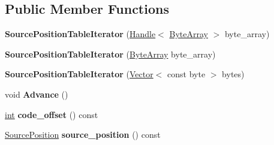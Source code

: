 \subsection*{Public Member Functions}
\begin{DoxyCompactItemize}
\item 
\mbox{\label{classv8_1_1internal_1_1SourcePositionTableIterator_ae5f159345c88e6b6b7778d65aca7fe71}} 
{\bfseries Source\+Position\+Table\+Iterator} (\mbox{\hyperlink{classv8_1_1internal_1_1Handle}{Handle}}$<$ \mbox{\hyperlink{classv8_1_1internal_1_1ByteArray}{Byte\+Array}} $>$ byte\+\_\+array)
\item 
\mbox{\label{classv8_1_1internal_1_1SourcePositionTableIterator_acfce9c7817e2cc9dbb327f998f7049a8}} 
{\bfseries Source\+Position\+Table\+Iterator} (\mbox{\hyperlink{classv8_1_1internal_1_1ByteArray}{Byte\+Array}} byte\+\_\+array)
\item 
\mbox{\label{classv8_1_1internal_1_1SourcePositionTableIterator_a0209cb81cff48bce3b4346da876dc110}} 
{\bfseries Source\+Position\+Table\+Iterator} (\mbox{\hyperlink{classv8_1_1internal_1_1Vector}{Vector}}$<$ const byte $>$ bytes)
\item 
\mbox{\label{classv8_1_1internal_1_1SourcePositionTableIterator_a9b785b72298036b52c63f95d9a65f256}} 
void {\bfseries Advance} ()
\item 
\mbox{\label{classv8_1_1internal_1_1SourcePositionTableIterator_ad98189665bf08418a805faf4d9861a3e}} 
\mbox{\hyperlink{classint}{int}} {\bfseries code\+\_\+offset} () const
\item 
\mbox{\label{classv8_1_1internal_1_1SourcePositionTableIterator_abf6e147228bac707e824d768ac15ad2b}} 
\mbox{\hyperlink{classv8_1_1internal_1_1SourcePosition}{Source\+Position}} {\bfseries source\+\_\+position} () const
\item 
\mbox{\label{classv8_1_1internal_1_1SourcePositionTableIterator_a0c544ad2e93732e877653d84794076ff}} 

\end{DoxyCompactItemize}
